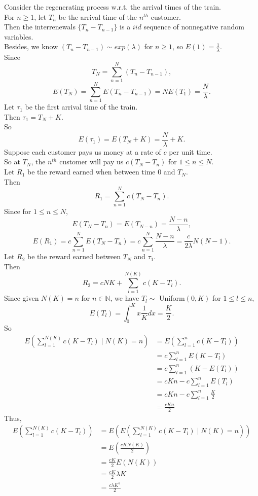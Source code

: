 \documentclass{extarticle}
\newcommand{\bbn}{\mathbb{N}}
\theoremstyle{plain}
\theoremstyle{definition}
\begin{document}
\noindent {}
Consider the regenerating process w.r.t. the arrival times of the train.\\
For $n \geq 1$, let $T_n$ be the arrival time of the $n^{th}$ customer.\\
Then the interrenewals $\{T_{n}-T_{n-1}\}$ is a $iid$ sequence of nonnegative random variables.\\ 
Besides, we know $\left(T_{n}-T_{n-1}\right) \sim exp(\lambda)$ for $n \geq 1$, so $E(1) = \frac{1}{\lambda}.$\\
Since 
\[T_N = \sum_{n=1}^N \left(T_{n}-T_{n-1}\right),\]
\[E(T_N) = \sum_{n=1}^NE\left(T_{n}-T_{n-1}\right) = NE(T_{1}) = \frac{N}{\lambda}.\] 
Let $\tau_1$ be the first arrival time of the train.\\
Then $\tau_1 = T_N + K$. \\
So \[ E(\tau_1) = E(T_N + K) = \frac{N}{\lambda}  + K. \]
Suppose each customer pays us money at a rate of $c$ per unit time.\\
So at $T_N$, the $n^{th}$ customer will pay us $c(T_N-T_n)$ for $1 \leq n \leq N$.\\
Let $R_1$ be the reward earned when between time 0 and $T_N$.\\
Then 
\[R_1 = \sum_{n=1}^{N}c(T_N-T_n).\]
Since for $1 \leq n \leq N$,
\[ E(T_N-T_n)  = E(T_{N-n}) = \frac{N-n}{\lambda},\]
\[E(R_1) = c\sum_{n=1}^{N}E(T_N-T_n) = c\sum_{n=1}^N \frac{N-n}{\lambda} = \frac{c}{2\lambda}N(N-1).\]
Let $R_2$ be the reward earned between $T_N$ and $\tau_1$.\\
Then 
\[R_2 = cNK + \sum_{l=1}^{N(K)}c(K-T_l).\]
Since given $N(K) = n$ for $n \in \bbn$, we have $T_{l} \sim $ Uniform$(0, K)$ for $1 \leq l \leq n$,\\
\[E\left(T_l\right) = \int_{0}^K x \frac{1}{K} dx = \frac{K}{2}.\]
So
\begin{align*}
	E\left(\sum_{l=1}^{N(K)}c(K-T_l) \mid N(K) =n \right) &= E\left(\sum_{l=1}^{n}c(K-T_l) \right) \\
  								&= c\sum_{l=1}^nE(K-T_l) \\
  								&= c\sum_{l=1}^n\left(K-E(T_l)\right)\\
  								&= cKn-c\sum_{l=1}^nE(T_l) \\
  								& = cKn-c\sum_{l=1}^n \frac{K}{2} \\
  								&= \frac{cKn}{2}
\end{align*}
Thus,
\begin{align*}
  E\left(\sum_{l=1}^{N(K)}c(K-T_l)\right) &= E\left( E\left(\sum_{l=1}^{N(K)}c(K-T_l) \mid N(K) =n \right)\right)\\
  										&= E\left(\frac{cKN(K)}{2} \right)\\
 			 							&= \frac{cK}{2}E\left(N(K)\right) \\
  										&= \frac{cK}{2} \lambda K \\
  									    &= \frac{c\lambda K^2}{2}
\end{align*}
\end{document}
